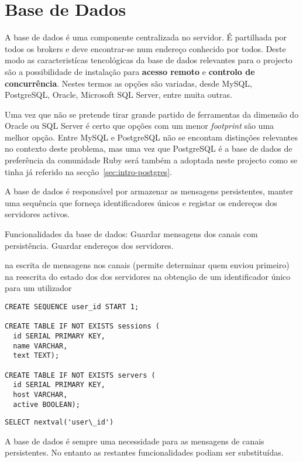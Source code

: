 \section{Base de Dados}
A base de dados é uma componente centralizada no servidor. É partilhada por todos os brokers e deve encontrar-se num endereço conhecido por todos. Deste modo as caracteristícas tencológicas da base de dados relevantes para o projecto são a possibilidade de instalação para \textbf{acesso remoto} e \textbf{controlo de concurrência}.
Nestes termos as opções são variadas, desde MySQL, PostgreSQL, Oracle, Microsoft SQL Server, entre muita outras.

Uma vez que não se pretende tirar grande partido de ferramentas da dimensão do Oracle ou SQL Server é certo que opções com um menor \textit{footprint} são uma melhor opção. Entre MySQL e PostgreSQL não se encontam distinções relevantes no contexto deste problema, mas uma vez que PostgreSQL é a base de dados de preferência da comunidade Ruby será também a adoptada neste projecto como se tinha já referido na secção~\ref{sec:intro-postgres}.

A base de dados é responsável por armazenar as mensagens persistentes, manter uma sequência que forneça identificadores únicos e registar os endereços dos servidores activos.

Funcionalidades da base de dados:
Guardar mensagens dos canais com persistência.
Guardar endereços dos servidores.

na escrita de mensagens nos canais (permite determinar quem enviou primeiro)
na reescrita do estado dos dos servidores
na obtenção de um identificador único para um utilizador

\renewcommand*{\lstlistingname}{SQL}
\begin{lstlisting}
CREATE SEQUENCE user_id START 1;

CREATE TABLE IF NOT EXISTS sessions (
  id SERIAL PRIMARY KEY,
  name VARCHAR,
  text TEXT);

CREATE TABLE IF NOT EXISTS servers (
  id SERIAL PRIMARY KEY,
  host VARCHAR,
  active BOOLEAN);
\end{lstlisting}

\begin{lstlisting}
SELECT nextval('user\_id')
\end{lstlisting}


A base de dados é sempre uma necessidade para as mensagens de canais persistentes.
No entanto as restantes funcionalidades podiam ser substituídas.

